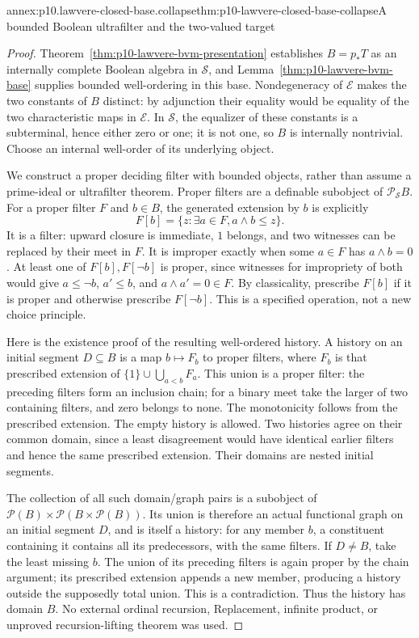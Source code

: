 \begin{annexitem}{annex:p10.lawvere-closed-base.collapse}{thm:p10-lawvere-closed-base-collapse}{A bounded Boolean ultrafilter and the two-valued target}
\begin{proof}
Theorem~\ref{thm:p10-lawvere-bvm-presentation} establishes \(B=p_*T\)
as an internally complete Boolean algebra in \(\mathcal S\), and
Lemma~\ref{thm:p10-lawvere-bvm-base} supplies bounded well-ordering
in this base. Nondegeneracy of \(\mathcal E\)
makes the two constants of \(B\) distinct: by adjunction their
equality would be equality of the two characteristic maps in
\(\mathcal E\). In \(\mathcal S\), the equalizer of these
constants is a subterminal, hence either zero or one; it is not one,
so \(B\) is internally nontrivial. Choose an internal well-order
of its underlying object.

We construct a proper deciding filter with bounded objects, rather
than assume a prime-ideal or ultrafilter theorem. Proper filters are
a definable subobject of \(\mathcal P_{\mathcal S}B\).
For a proper filter \(F\) and \(b\in B\), the generated
extension by \(b\) is explicitly
\[
       F[b]=\{z:\exists a\in F, a\wedge b\le z\}.
\]
It is a filter: upward closure is immediate, \(1\) belongs, and
two witnesses can be replaced by their meet in \(F\).
It is improper exactly when some \(a\in F\) has \(a\wedge b=0\).
At least one of \(F[b],F[\neg b]\) is proper, since witnesses
for impropriety of both would give \(a\le\neg b\),
\(a'\le b\), and \(a\wedge a'=0\in F\).
By classicality, prescribe \(F[b]\) if it is proper and otherwise
prescribe \(F[\neg b]\). This is a specified operation, not a
new choice principle.

Here is the existence proof of the resulting well-ordered history.
A history on an initial segment \(D\subseteq B\) is a map
\(b\mapsto F_b\) to proper filters, where \(F_b\) is that
prescribed extension of
\(\{1\}\cup\bigcup_{a<b}F_a\). This union is a proper
filter: the preceding filters form an inclusion chain; for a binary
meet take the larger of two containing filters, and zero belongs
to none. The monotonicity follows from the prescribed extension.
The empty history is allowed. Two histories agree on their common
domain, since a least disagreement would have identical earlier
filters and hence the same prescribed extension. Their domains are
nested initial segments.

The collection of all such domain/graph pairs is a subobject of
\(\mathcal P(B)\times\mathcal P(B\times\mathcal P(B))\).
Its union is therefore an actual functional graph on an initial
segment \(D\), and is itself a history: for any member \(b\),
a constituent containing it contains all its predecessors, with
the same filters. If \(D\ne B\), take the least missing \(b\).
The union of its preceding filters is again proper by the chain
argument; its prescribed extension appends a new member, producing
a history outside the supposedly total union. This is a contradiction.
Thus the history has domain \(B\). No external ordinal recursion,
Replacement, infinite product, or unproved recursion-lifting theorem
was used.


\end{proof}
\end{annexitem}
